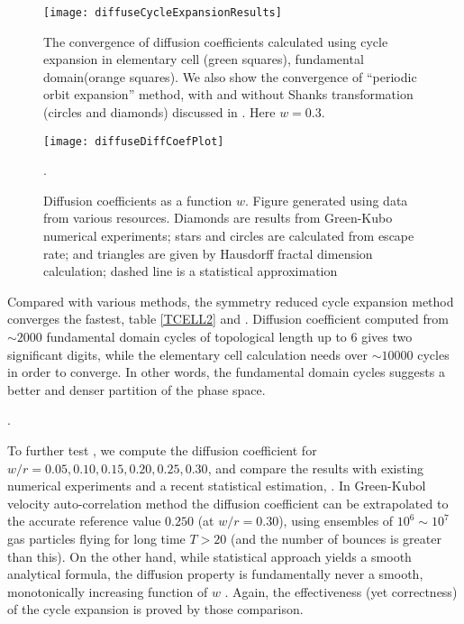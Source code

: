 \documentclass[aps,pre,
                showpacs,
                twocolumn,
                groupedaddress,
                floatfix]{revtex4-1}
\begin{document}
\begin{figure}[htbp]
  \texttt{[image: diffuseCycleExpansionResults]}
  \caption[]{\label{fig-convergence} The convergence of diffusion coefficients  calculated using cycle expansion in elementary cell (green squares),  fundamental domain(orange squares). We  also show the convergence of ``periodic orbit expansion'' method, with and  without Shanks transformation (circles and diamonds) discussed in  . Here $w = 0.3$.  }
\end{figure}

\begin{figure}
\texttt{[image: diffuseDiffCoefPlot]}
  \caption[]{\label{fig-results} Diffusion coefficients as a function $w$.  Figure generated using data from various resources. Diamonds are results from  Green-Kubo numerical experiments; stars and  circles are calculated from escape rate; and triangles are  given by Hausdorff fractal dimension calculation; dashed line  is a statistical approximation}.
\end{figure}

Compared with various methods, the symmetry reduced cycle expansion method converges the fastest, table \ref{TCELL2} and . Diffusion coefficient computed from $\sim2000$ fundamental domain cycles of topological length up to 6 gives two significant digits, while the elementary cell calculation needs over $\sim 10000$ cycles in order to converge. In other words, the fundamental domain cycles suggests a better and denser partition of the phase space.

.

To further test , we compute the diffusion coefficient for $w/r = 0.05, 0.10, 0.15, 0.20, 0.25, 0.30$, and compare the results with existing numerical experiments and a recent statistical estimation, . In Green-Kubol velocity auto-correlation method the  diffusion coefficient can be extrapolated to the accurate reference value $0.250$ (at $w/r=0.30$), using ensembles of $10^6\sim10^7$ gas particles flying for long time $T>20$ (and the number of bounces is greater than this). On the other hand, while statistical approach yields a smooth analytical formula, the diffusion property is fundamentally never a smooth, monotonically increasing function of $w$ 
. Again, the effectiveness (yet correctness) of the cycle expansion is proved by those comparison.
\end{document}

